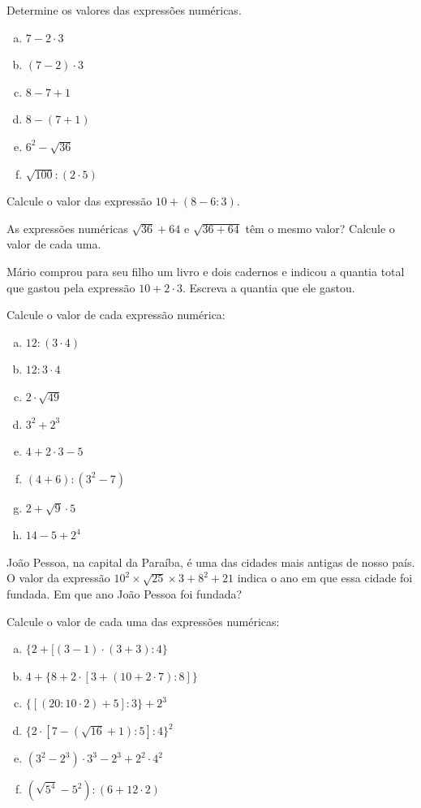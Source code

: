 	\item Determine os valores das expressões numéricas.
	\begin{multicols}{3}
	\begin{enumerate}[a)]
		\item $7-2\cdot 3$
		\item $(7-2)\cdot 3$
		\item $8-7+1$
		\item $8-(7+1)$
		\item $6^2-\sqrt{36}$
		\item $\sqrt{100}:(2\cdot 5)$
	\end{enumerate}
	\end{multicols}
	\item Calcule o valor das expressão $10+(8-6:3)$.
	\item As expressões numéricas $\sqrt{36}+64$ e $\sqrt{36+64}$ têm o mesmo valor? Calcule o valor de cada uma.
	\item Mário comprou para seu filho um livro e dois cadernos e indicou a quantia total que gastou pela expressão $10+2\cdot 3$. Escreva a quantia que ele gastou.
	\item Calcule o valor de cada expressão numérica:
	\begin{multicols}{4}
	\begin{enumerate}[a)]
		\item $12:(3\cdot 4)$
		\item $12:3\cdot 4$
		\item $2\cdot \sqrt{49}$
		\item $3^2+2^3$
		\item $4+2\cdot 3-5$
		\item $(4+6):(3^2-7)$
		\item $2+\sqrt{9}\cdot 5$
		\item $14-5+2^4$
	\end{enumerate}
	\end{multicols}
	\item João Pessoa, na capital da Paraíba, é uma das cidades mais antigas de nosso país. O valor da expressão $10^2\times\sqrt{25}\times3+8^2 +21$ indica o ano em que essa cidade foi fundada. Em que ano João Pessoa foi fundada?
	\item Calcule o valor de cada uma das expressões numéricas:
	\begin{multicols}{2}
	\begin{enumerate}[a)]
		\item $\{2+[(3-1)\cdot (3+3):4\}$
		\item $4+\{8+2\cdot [3+(10+2\cdot 7):8]\}$
		\item $\{[(20:10\cdot 2)+5]:3\}+2^3$
		\item $\{2\cdot [7-(\sqrt{16}+1):5]:4\}^2$
		\item $(3^2-2^3)\cdot 3^3-2^3+2^2\cdot 4^2$
		\item $(\sqrt{5^4}-5^2):(6+12\cdot 2)$
	\end{enumerate}
	\end{multicols}


